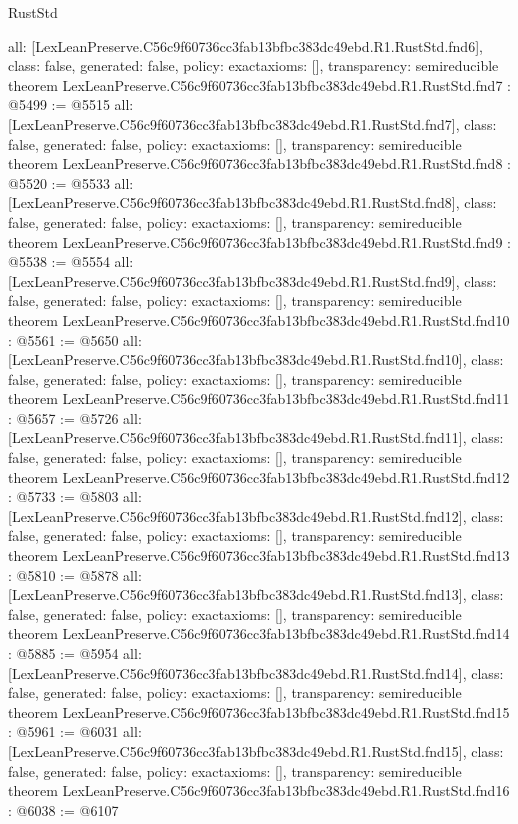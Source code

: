 \begin{lexlean}{RustStd}
\begin{coremodule}
{  all: [LexLeanPreserve.C56c9f60736cc3fab13bfbc383dc49ebd.R1.RustStd.fnd6],
  class: false,
  generated: false,
  policy: exact{axioms: []},
  transparency: semireducible
}
theorem LexLeanPreserve.C56c9f60736cc3fab13bfbc383dc49ebd.R1.RustStd.fnd7 : @5499 := @5515 {
  all: [LexLeanPreserve.C56c9f60736cc3fab13bfbc383dc49ebd.R1.RustStd.fnd7],
  class: false,
  generated: false,
  policy: exact{axioms: []},
  transparency: semireducible
}
theorem LexLeanPreserve.C56c9f60736cc3fab13bfbc383dc49ebd.R1.RustStd.fnd8 : @5520 := @5533 {
  all: [LexLeanPreserve.C56c9f60736cc3fab13bfbc383dc49ebd.R1.RustStd.fnd8],
  class: false,
  generated: false,
  policy: exact{axioms: []},
  transparency: semireducible
}
theorem LexLeanPreserve.C56c9f60736cc3fab13bfbc383dc49ebd.R1.RustStd.fnd9 : @5538 := @5554 {
  all: [LexLeanPreserve.C56c9f60736cc3fab13bfbc383dc49ebd.R1.RustStd.fnd9],
  class: false,
  generated: false,
  policy: exact{axioms: []},
  transparency: semireducible
}
theorem LexLeanPreserve.C56c9f60736cc3fab13bfbc383dc49ebd.R1.RustStd.fnd10 : @5561 := @5650 {
  all: [LexLeanPreserve.C56c9f60736cc3fab13bfbc383dc49ebd.R1.RustStd.fnd10],
  class: false,
  generated: false,
  policy: exact{axioms: []},
  transparency: semireducible
}
theorem LexLeanPreserve.C56c9f60736cc3fab13bfbc383dc49ebd.R1.RustStd.fnd11 : @5657 := @5726 {
  all: [LexLeanPreserve.C56c9f60736cc3fab13bfbc383dc49ebd.R1.RustStd.fnd11],
  class: false,
  generated: false,
  policy: exact{axioms: []},
  transparency: semireducible
}
theorem LexLeanPreserve.C56c9f60736cc3fab13bfbc383dc49ebd.R1.RustStd.fnd12 : @5733 := @5803 {
  all: [LexLeanPreserve.C56c9f60736cc3fab13bfbc383dc49ebd.R1.RustStd.fnd12],
  class: false,
  generated: false,
  policy: exact{axioms: []},
  transparency: semireducible
}
theorem LexLeanPreserve.C56c9f60736cc3fab13bfbc383dc49ebd.R1.RustStd.fnd13 : @5810 := @5878 {
  all: [LexLeanPreserve.C56c9f60736cc3fab13bfbc383dc49ebd.R1.RustStd.fnd13],
  class: false,
  generated: false,
  policy: exact{axioms: []},
  transparency: semireducible
}
theorem LexLeanPreserve.C56c9f60736cc3fab13bfbc383dc49ebd.R1.RustStd.fnd14 : @5885 := @5954 {
  all: [LexLeanPreserve.C56c9f60736cc3fab13bfbc383dc49ebd.R1.RustStd.fnd14],
  class: false,
  generated: false,
  policy: exact{axioms: []},
  transparency: semireducible
}
theorem LexLeanPreserve.C56c9f60736cc3fab13bfbc383dc49ebd.R1.RustStd.fnd15 : @5961 := @6031 {
  all: [LexLeanPreserve.C56c9f60736cc3fab13bfbc383dc49ebd.R1.RustStd.fnd15],
  class: false,
  generated: false,
  policy: exact{axioms: []},
  transparency: semireducible
}
theorem LexLeanPreserve.C56c9f60736cc3fab13bfbc383dc49ebd.R1.RustStd.fnd16 : @6038 := @6107 {
}
\end{coremodule}
\end{lexlean}
